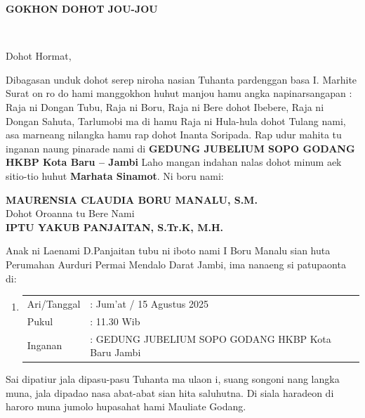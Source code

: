 \documentclass[24pt]{article}
\begin{document}
\begin{center}
{\begin{minipage}{\dimexpr\textwidth-2\fboxsep-2\fboxrule}
\begin{center}
\LARGE\textbf{GOKHON DOHOT JOU-JOU}
\end{center}\\ \hline
\vspace{0.3cm}
\Large{
Dohot Hormat,

\hspace{30pt}
Dibagasan unduk dohot serep niroha nasian Tuhanta pardenggan basa I. Marhite Surat on ro do hami manggokhon huhut manjou hamu angka napinarsangapan : Raja ni Dongan Tubu, Raja ni Boru, Raja ni Bere dohot Ibebere, Raja ni Dongan Sahuta, Tarlumobi ma di hamu Raja ni Hula-hula dohot Tulang nami,  asa marneang nilangka hamu rap dohot Inanta Soripada. Rap udur mahita tu inganan naung pinarade nami di
\textbf{GEDUNG JUBELIUM SOPO GODANG HKBP Kota Baru -- Jambi} Laho mangan indahan nalas dohot minum aek sitio-tio huhut \textbf{Marhata Sinamot}. Ni boru nami:}

\begin{center}
{\Large \textbf{\MakeUppercase{Maurensia Claudia Boru Manalu, S.M.}}}
\\[0.1cm]
\Large {Dohot Oroanna tu Bere Nami }
\\[0.1cm]
{\Large \textbf{\MakeUppercase{Iptu Yakub Panjaitan,} S.Tr.K,  M.H.}}
\end{center}

Anak ni Laenami D.Panjaitan tubu ni iboto nami I Boru Manalu sian huta Perumahan Aurduri Permai Mendalo Darat Jambi, ima nanaeng si patupaonta di:

\begin{enumerate}[label={}]
\item\begin{tabular}{ l l }
Ari/Tanggal & :  Jum'at / 15 Agustus 2025 \\
Pukul & :  11.30 Wib \\
Inganan& :  GEDUNG JUBELIUM SOPO GODANG HKBP Kota Baru Jambi \\
\end{tabular}
\end{enumerate}

Sai dipatiur jala dipasu-pasu Tuhanta ma ulaon i, suang songoni nang langka muna, jala dipadao nasa abat-abat sian hita saluhutna. Di siala haradeon di haroro muna jumolo hupasahat hami Mauliate Godang.

\begin{center}
    


\end{center}
\end{minipage}}
\end{center}
\end{document}
